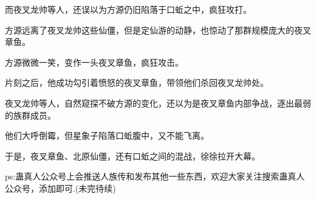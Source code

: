\begin{this_body}
而夜叉龙帅等人，还误以为方源仍旧陷落于口蚯之中，疯狂攻打。

方源远离了夜叉龙帅这些仙僵，但是定仙游的动静，也惊动了那群规模庞大的夜叉章鱼。

方源微微一笑，变作一头夜叉章鱼，疯狂攻击。

片刻之后，他成功勾引着愤怒的夜叉章鱼，带领他们杀回夜叉龙帅处。

夜叉龙帅等人，自然窥探不破方源的变化，还以为是夜叉章鱼内部争战，逐出最弱的族群成员。

他们大呼倒霉，但星象子陷落口蚯腹中，又不能飞离。

于是，夜叉章鱼、北原仙僵，还有口蚯之间的混战，徐徐拉开大幕。

ps:蛊真人公众号上会推送人族传和发布其他一些东西，欢迎大家关注搜索蛊真人公众号，添加即可.(未完待续)

\end{this_body}

